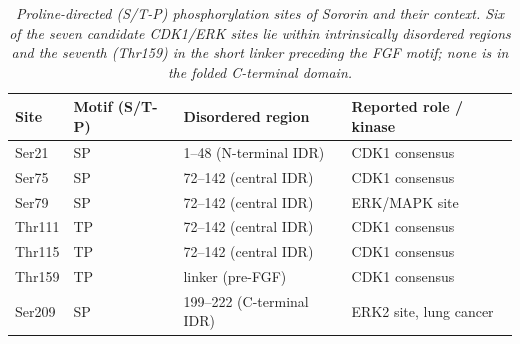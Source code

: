 \documentclass[11pt]{article}
\begin{document}
\begin{table}[htbp]
\centering
\caption{\textit{Proline-directed (S/T-P) phosphorylation sites of Sororin and their context. Six of the seven candidate CDK1/ERK sites lie within intrinsically disordered regions and the seventh (Thr159) in the short linker preceding the FGF motif; none is in the folded C-terminal domain.}}
\label{tab:phos}
\small
\begin{tabular}{llll}
\toprule
Site & Motif (S/T-P) & Disordered region & Reported role / kinase \\
\midrule
Ser21  & SP & 1--48 (N-terminal IDR)   & CDK1 consensus \citep{dreier2011} \\
Ser75  & SP & 72--142 (central IDR)    & CDK1 consensus \citep{dreier2011} \\
Ser79  & SP & 72--142 (central IDR)    & ERK/MAPK site \citep{nguyen2010} \\
Thr111 & TP & 72--142 (central IDR)    & CDK1 consensus \citep{dreier2011} \\
Thr115 & TP & 72--142 (central IDR)    & CDK1 consensus \citep{dreier2011} \\
Thr159 & TP & linker (pre-FGF)         & CDK1 consensus \citep{dreier2011} \\
Ser209 & SP & 199--222 (C-terminal IDR)& ERK2 site, lung cancer \citep{nguyen2010} \\
\bottomrule
\end{tabular}
\end{table}

\FloatBarrier
\end{document}
